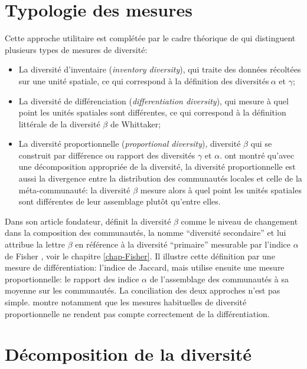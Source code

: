 \documentclass[
  11pt,
  french,
  a4paper,
  extrafontsizes,onecolumn,openright
  ]{memoir}
\providecommand{\tightlist}{%
  \setlength{\itemsep}{0pt}\setlength{\parskip}{0pt}}
\begin{document}
\section{Typologie des mesures}\label{sec-betaTypo}

Cette approche utilitaire est complétée par le cadre théorique de \textcite{Jurasinski2009} qui distinguent plusieurs types de mesures de diversité:

\begin{itemize}
\tightlist
\item
  La diversité d'inventaire (\emph{inventory diversity}), qui traite des données récoltées sur une unité spatiale, ce qui correspond à la définition des diversités\(\ \alpha\) et \(\gamma\);
\item
  La diversité de différenciation (\emph{differentiation diversity}), qui mesure à quel point les unités spatiales sont différentes, ce qui correspond à la définition littérale de la diversité \(\beta\) de Whittaker;
\item
  La diversité proportionnelle (\emph{proportional diversity}), diversité \(\beta\) qui se construit par différence ou rapport des diversités \(\gamma\) et \(\alpha\). \textcite{Marcon2014a} ont montré qu'avec une décomposition appropriée de la diversité, la diversité proportionnelle est aussi la divergence entre la distribution des communautés locales et celle de la méta-communauté: la diversité \(\beta\) mesure alors à quel point les unités spatiales sont différentes de leur assemblage plutôt qu'entre elles.
\end{itemize}

Dans son article fondateur, \textcite{Whittaker1960} définit la diversité \(\beta\) comme le niveau de changement dans la composition des communautés, la nomme ``diversité secondaire'' et lui attribue la lettre \(\beta\) en référence à la diversité ``primaire'' mesurable par l'indice \(\alpha\) de Fisher \autocite{Fisher1943}, voir le chapitre \ref{chap-Fisher}.
Il illustre cette définition par une mesure de différentiation: l'indice de Jaccard, mais utilise ensuite une mesure proportionnelle: le rapport des indice \(\alpha\) de l'assemblage des communautés à sa moyenne sur les communautés.
La conciliation des deux approches n'est pas simple.
\textcite{Gregorius2016} montre notamment que les mesures habituelles de diversité proportionnelle ne rendent pas compte correctement de la différentiation.

\section{Décomposition de la diversité}\label{sec-betaDecomposition}
\end{document}
